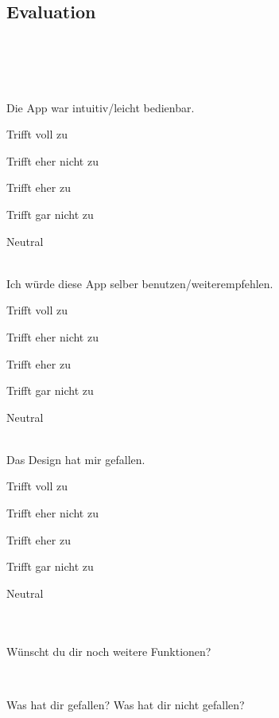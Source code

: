 \documentclass{article}
\newenvironment{Ckcol}[1]{\begin{multicols}{#1}%
        \begin{todolist}}%
              {\end{todolist}%
                           \end{multicols}}
\begin{document}
\begin{center} \section*{Evaluation} 
\ \\
\  \\
\ \\ 
\ \\
Die App war intuitiv/leicht bedienbar.
   \begin{Ckcol}{3}

    \item  Trifft voll zu
    \item  Trifft eher nicht zu
    \item  Trifft eher zu
    \item  Trifft gar nicht zu
    \item  Neutral

   \end{Ckcol}  
   
   \ \\

 Ich würde diese App selber benutzen/weiterempfehlen.
      \begin{Ckcol}{3}

    \item  Trifft voll zu
    \item  Trifft eher nicht zu
    \item  Trifft eher zu
    \item  Trifft gar nicht zu
    \item  Neutral
    

   \end{Ckcol}
 
   \ \\
   
  Das Design hat mir gefallen.
      \begin{Ckcol}{3}

   \item  Trifft voll zu
    \item  Trifft eher nicht zu
    \item  Trifft eher zu
    \item  Trifft gar nicht zu
    \item  Neutral
    

   \end{Ckcol}
    \ \\
   \ \\
  
Wünscht du dir noch weitere Funktionen?
\end{center}
\begin{center}
 \setlength{\fboxsep}{1pt} 
 \fbox{\parbox[t][4cm][t]{12cm}{~}}
\end{center}

\ \\
\begin{center}
Was hat dir gefallen? Was hat dir nicht gefallen?

 \setlength{\fboxsep}{1pt} 
 \fbox{\parbox[t][4cm][t]{12cm}{~}}
\end{center}
\end{document}
